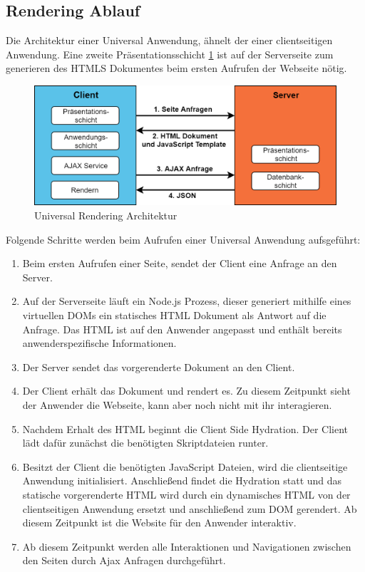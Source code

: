 \documentclass[runningheads]{llncs}
\numberwithin{figure}{section}
\begin{document}
\subsection{Rendering Ablauf}
\label{subsec:Rendering Ablauf}
Die Architektur einer Universal Anwendung, ähnelt der einer clientseitigen Anwendung. Eine
zweite Präsentationsschicht \ref{Universal Rendering Architektur} ist auf der Serverseite zum generieren des HTMLS Dokumentes beim
ersten Aufrufen der Webseite nötig.
\begin{figure}[h]
  \centering
  \includegraphics[width=12cm]{images/universal}
  \caption{Universal Rendering Architektur}
  \label{Universal Rendering Architektur}
\end{figure}
\newpage
\noindent
Folgende Schritte werden beim Aufrufen einer Universal Anwendung aufsgeführt:
\begin{enumerate}
  \setlength\itemsep{1em}
  \item Beim ersten Aufrufen einer Seite, sendet der Client eine Anfrage an den Server.
  \item Auf der Serverseite läuft ein Node.js Prozess, 
  dieser generiert mithilfe eines virtuellen DOMs 
  ein statisches HTML Dokument als Antwort auf die Anfrage. 
  Das HTML ist auf den Anwender angepasst und enthält bereits anwenderspezifische Informationen.
  \item Der Server sendet das vorgerenderte Dokument an den Client.
  \item Der Client erhält das Dokument und rendert es. 
  Zu diesem Zeitpunkt sieht der Anwender die Webseite, 
  kann aber noch nicht mit ihr interagieren.
  \item Nachdem Erhalt des HTML beginnt die Client Side Hydration. 
  Der Client lädt dafür zunächst die benötigten Skriptdateien runter.
  \item Besitzt der Client die benötigten JavaScript Dateien, 
  wird die clientseitige Anwendung initialisiert. 
  Anschließend findet die Hydration statt und 
  das statische vorgerenderte HTML wird 
  durch ein dynamisches HTML von der clientseitigen Anwendung ersetzt und 
  anschließend zum DOM gerendert. 
  Ab diesem Zeitpunkt ist die Website für den Anwender interaktiv.
  \item Ab diesem Zeitpunkt werden alle Interaktionen und 
  Navigationen zwischen den Seiten durch Ajax Anfragen durchgeführt.
\end{enumerate}
\newpage
\end{document}
